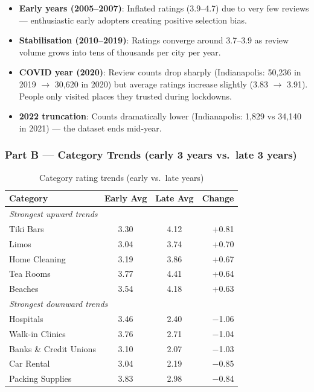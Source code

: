 \documentclass[12pt,a4paper]{article}
\begin{document}
\begin{itemize}
  \item \textbf{Early years (2005--2007)}: Inflated ratings (3.9--4.7) due to
    very few reviews --- enthusiastic early adopters creating positive selection
    bias.
  \item \textbf{Stabilisation (2010--2019)}: Ratings converge around 3.7--3.9
    as review volume grows into tens of thousands per city per year.
  \item \textbf{COVID year (2020)}: Review counts drop sharply (Indianapolis:
    50,236 in 2019 $\to$ 30,620 in 2020) but average ratings increase slightly
    (3.83 $\to$ 3.91). People only visited places they trusted during lockdowns.
  \item \textbf{2022 truncation}: Counts dramatically lower (Indianapolis: 1,829
    vs 34,140 in 2021) --- the dataset ends mid-year.
\end{itemize}

\subsubsection*{Part B --- Category Trends (early 3 years vs.\ late 3 years)}

\begin{table}[H]
  \centering
  \begin{tabular}{lccr}
    \toprule
    \textbf{Category} & \textbf{Early Avg} & \textbf{Late Avg} & \textbf{Change} \\
    \midrule
    \multicolumn{4}{l}{\textit{Strongest upward trends}} \\
    Tiki Bars          & 3.30 & 4.12 & +0.81 \\
    Limos              & 3.04 & 3.74 & +0.70 \\
    Home Cleaning      & 3.19 & 3.86 & +0.67 \\
    Tea Rooms          & 3.77 & 4.41 & +0.64 \\
    Beaches            & 3.54 & 4.18 & +0.63 \\
    \midrule
    \multicolumn{4}{l}{\textit{Strongest downward trends}} \\
    Hospitals          & 3.46 & 2.40 & $-$1.06 \\
    Walk-in Clinics    & 3.76 & 2.71 & $-$1.04 \\
    Banks \& Credit Unions & 3.10 & 2.07 & $-$1.03 \\
    Car Rental         & 3.04 & 2.19 & $-$0.85 \\
    Packing Supplies   & 3.83 & 2.98 & $-$0.84 \\
    \bottomrule
  \end{tabular}
  \caption{Category rating trends (early vs.\ late years)}
\end{table}
\end{document}
